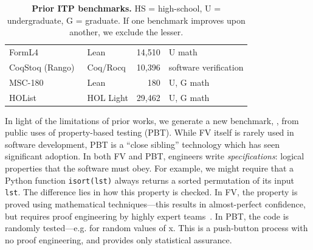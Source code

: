 \begin{table}[h]
\begin{tabularx}{\textwidth}{@{}
    >{\raggedright\arraybackslash}p{3.3cm}
    l
    r
    >{\raggedright\arraybackslash}X@{}}
FormL4~\cite{lu2024process}
  & Lean & 14{,}510 & U math \\
CoqStoq (Rango)~\cite{thompson2024rango}
  & Coq/Rocq & 10{,}396 & software verification \\
MSC-180~\cite{li2025msc}
  & Lean & 180 & U, G math \\
HOList~\cite{bansal2019holist}
  & HOL Light & 29{,}462 & U, G math \\
\bottomrule
\end{tabularx}
\caption{\textbf{Prior ITP benchmarks.} HS = high-school, U = undergraduate, G = graduate. If one benchmark improves upon another, we exclude the lesser.}
\label{tab:fv-benchmarks}
\end{table}

In light of the limitations of prior works, we generate a new benchmark, \FVSpec, from public uses of property-based testing (PBT). 
While FV itself is rarely used in software development, PBT is a ``close sibling'' technology which has seen significant adoption. In both FV and PBT, engineers write \emph{specifications}: logical properties that the software must obey. For example, we might require that a Python function \texttt{isort(lst)} always returns a sorted permutation of its input \texttt{lst}. The difference lies in how this property is checked. In FV, the property is proved using mathematical techniques---this results in almost-perfect confidence, but requires proof engineering by highly expert teams~\cite{dodds2022formally}. In PBT, the code is randomly tested---e.g. for random values of x. This is a push-button process with no proof engineering, and provides only statistical assurance.



